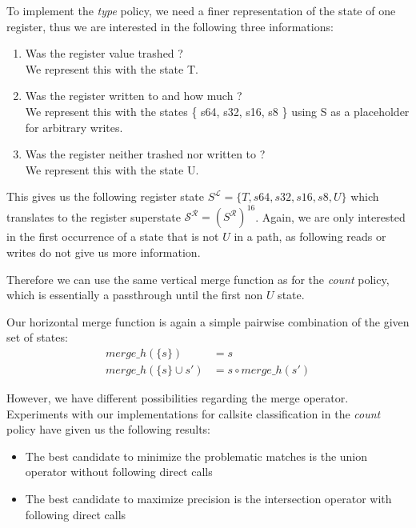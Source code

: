 To implement the \emph{type} policy, we need a finer representation of the state of one register, thus we are interested in the following three informations:
\begin{enumerate}
\item Was the register value trashed ? \\ We represent this with the state T.
\item Was the register written to and how much ? \\ We represent this with the states \{ s64, s32, s16, s8 \} using S as a placeholder for arbitrary writes.
\item Was the register neither trashed nor written to ? \\ We represent this with the state U.
\end{enumerate}
This gives us the following register state $S^\mathcal{L} = \{ T, s64, s32, s16, s8, U \}$ which translates to the register superstate $\mathcal{S}^\mathcal{R} = (S^\mathcal{R})^{16}$.
Again, we are only interested in the first occurrence of a state that is not $U$ in a path, as following reads or writes do not give us more information.

Therefore we can use the same vertical merge function as for the \emph{count} policy, which is essentially a passthrough until the first non $U$ state.

Our horizontal merge function is again a simple pairwise combination of the given set of states:
\begin{align}
merge\_h(\{s\}) &= s\\
merge\_h(\{s\} \cup s') &= s \circ merge\_h(s')
\end{align}

However, we have different possibilities regarding the merge operator. Experiments with our implementations for callsite classification in the \emph{count} policy have given us the following results:
\begin{itemize}
\item The best candidate to minimize the problematic matches is the union operator without following direct calls
\item The best candidate to maximize precision is the intersection operator with following direct calls
\end{itemize}

